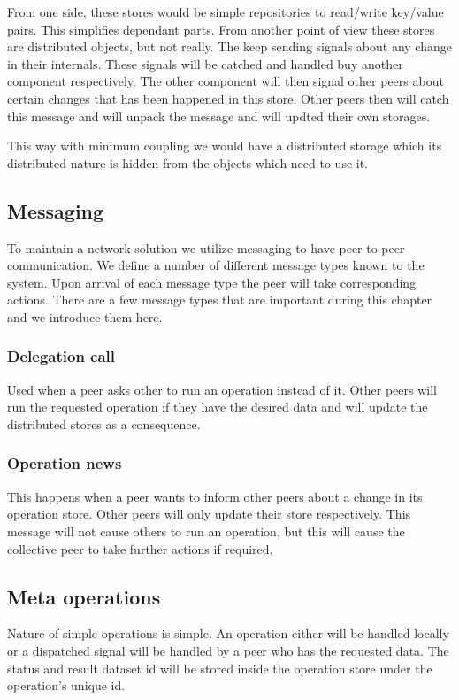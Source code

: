 From one side, these stores would be simple repositories to read/write key/value pairs.
This simplifies dependant parts.
From another point of view these stores are distributed objects, but not really.
The keep sending signals about any change in their internals.
These signals will be catched and handled buy another component respectively.
The other component will then signal other peers about certain changes that has been happened in this store.
Other peers then will catch this message and will unpack the message and will updted their own storages.

This way with minimum coupling we would have a distributed storage which its distributed nature is hidden from
the objects which need to use it.

\subsection{Messaging}
To maintain a network solution we utilize messaging to have peer-to-peer communication. 
We define a number of different message types known to the system. 
Upon arrival of each message type the peer will take corresponding actions.
There are a few message types that are important during this chapter and we introduce them here.

\subsubsection{Delegation call}
Used when a peer asks other to run an operation instead of it.
Other peers will run the requested operation if they have the desired data and will update
the distributed stores as a consequence.

\subsubsection{Operation news}
This happens when a peer wants to inform other peers about a change in its operation store.
Other peers will only update their store respectively.
This message will not cause others to run an operation, 
but this will cause the collective peer to take further actions if required.

\subsection{Meta operations}
Nature of simple operations is simple. 
An operation either will be handled locally or a dispatched signal will be handled
by a peer who has the requested data. 
The status and result dataset id will be stored inside the operation store under the operation's unique id.

